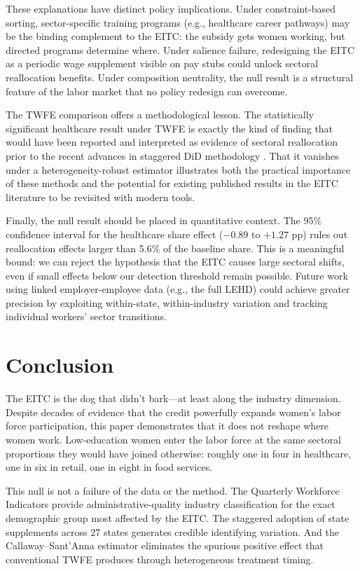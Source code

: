 \documentclass[12pt]{article}
\begin{document}
These explanations have distinct policy implications. Under constraint-based sorting, sector-specific training programs (e.g., healthcare career pathways) may be the binding complement to the EITC: the subsidy gets women working, but directed programs determine where. Under salience failure, redesigning the EITC as a periodic wage supplement visible on pay stubs could unlock sectoral reallocation benefits. Under composition neutrality, the null result is a structural feature of the labor market that no policy redesign can overcome.

The TWFE comparison offers a methodological lesson. The statistically significant healthcare result under TWFE is exactly the kind of finding that would have been reported and interpreted as evidence of sectoral reallocation prior to the recent advances in staggered DiD methodology \citep{callaway2021, goodman2021, sun2021, baker2022}. That it vanishes under a heterogeneity-robust estimator illustrates both the practical importance of these methods and the potential for existing published results in the EITC literature to be revisited with modern tools.

Finally, the null result should be placed in quantitative context. The 95\% confidence interval for the healthcare share effect ($-0.89$ to $+1.27$ pp) rules out reallocation effects larger than 5.6\% of the baseline share. This is a meaningful bound: we can reject the hypothesis that the EITC causes large sectoral shifts, even if small effects below our detection threshold remain possible. Future work using linked employer-employee data (e.g., the full LEHD) could achieve greater precision by exploiting within-state, within-industry variation and tracking individual workers' sector transitions.


\section{Conclusion}

The EITC is the dog that didn't bark---at least along the industry dimension. Despite decades of evidence that the credit powerfully expands women's labor force participation, this paper demonstrates that it does not reshape where women work. Low-education women enter the labor force at the same sectoral proportions they would have joined otherwise: roughly one in four in healthcare, one in six in retail, one in eight in food services.

This null is not a failure of the data or the method. The Quarterly Workforce Indicators provide administrative-quality industry classification for the exact demographic group most affected by the EITC. The staggered adoption of state supplements across 27 states generates credible identifying variation. And the Callaway--Sant'Anna estimator eliminates the spurious positive effect that conventional TWFE produces through heterogeneous treatment timing.
\end{document}
